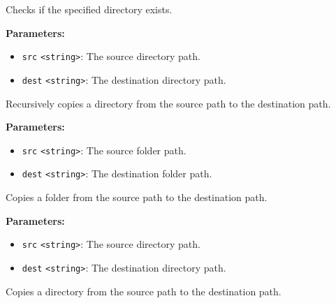 \documentclass[12pt,a4paper]{article}
\begin{document}
\noindent Checks if the specified directory exists.

\vspace{5mm}
\noindent {}


\noindent \textbf{Parameters:}
\begin{itemize}
  \item \texttt{src} \texttt{<string>}: The source directory path.
  \item \texttt{dest} \texttt{<string>}: The destination directory path.
\end{itemize}

\noindent Recursively copies a directory from the source path to the destination path.

\vspace{5mm}
\noindent {}


\noindent \textbf{Parameters:}
\begin{itemize}
  \item \texttt{src} \texttt{<string>}: The source folder path.
  \item \texttt{dest} \texttt{<string>}: The destination folder path.
\end{itemize}

\noindent Copies a folder from the source path to the destination path.

\vspace{5mm}
\noindent {}


\noindent \textbf{Parameters:}
\begin{itemize}
  \item \texttt{src} \texttt{<string>}: The source directory path.
  \item \texttt{dest} \texttt{<string>}: The destination directory path.
\end{itemize}

\noindent Copies a directory from the source path to the destination path.

\vspace{5mm}
\noindent {}
\end{document}
